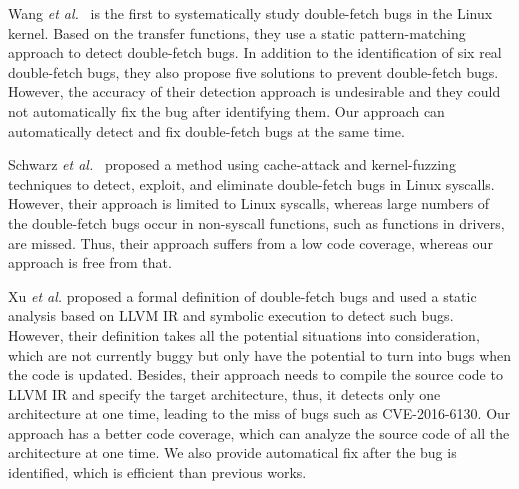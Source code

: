 \documentclass[10pt]{llncs}
\begin{document}

Wang \textit{et al.}~\cite{wang} is the first to systematically study double-fetch bugs in the Linux kernel. Based on the transfer functions, they use a static pattern-matching approach to detect double-fetch bugs. In addition to the identification of six real double-fetch bugs, they also propose five solutions to prevent double-fetch bugs. However, the accuracy of their detection approach is undesirable and they could not automatically fix the bug after identifying them. %
Our approach can automatically detect and fix double-fetch bugs at the same time.

Schwarz \textit{et al.}~\cite{modern} proposed a method using cache-attack and kernel-fuzzing techniques to detect, exploit, and eliminate double-fetch bugs in Linux syscalls. %
However, their approach is limited to Linux syscalls, whereas large numbers of the double-fetch bugs occur in non-syscall functions, such as functions in drivers, are missed. Thus, their approach suffers from a low code coverage, whereas our approach is free from that.%

Xu \textit{et al.}\cite{precise} proposed a formal definition of double-fetch bugs and used a static analysis based on LLVM IR and symbolic execution to detect such bugs. However, their definition takes all the potential situations into consideration, which are not currently buggy but only have the potential to turn into bugs when the code is updated. Besides, their approach needs to compile the source code to LLVM IR and specify the target architecture, thus, it detects only one architecture at one time, leading to the miss of bugs such as CVE-2016-6130. Our approach has a better code coverage, which can analyze the source code of all the architecture at one time. We also provide automatical fix after the bug is identified, which is efficient than previous works.
\end{document}
